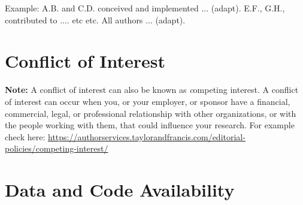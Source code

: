\documentclass[%
 reprint,
 amsmath,amssymb,
 aps,
]{revtex4-2}
\begin{document}
\noindent
{}
Example: A.B. and C.D. conceived and implemented ... (adapt). E.F., G.H., contributed to .... etc etc. All authors ... (adapt).



\section{\label{sec:COI}Conflict of Interest} %

\noindent
{}

{{\bf Note:} A conflict of interest can also be known as {\emph competing interest}. A conflict of interest can occur when you, or your employer, or sponsor have a financial, commercial, legal, or professional relationship with other organizations, or with the people working with them, that could influence your research.
For example check here:} \href{https://authorservices.taylorandfrancis.com/editorial-policies/competing-interest/}{https://authorservices.taylorandfrancis.com/editorial-policies/competing-interest/}




\section{\label{sec:datacode}Data and Code Availability} %

\noindent
{}
\end{document}
